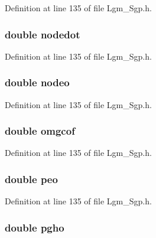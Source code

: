 Definition at line 135 of file Lgm\_\-Sgp.h.\hypertarget{struct___sgp_info_9a7d9ae35fbeac8903eb8ebf5f9d31cc}{
\subsubsection[{nodedot}]{\setlength{\rightskip}{0pt plus 5cm}double {\bf nodedot}}}
\label{struct___sgp_info_9a7d9ae35fbeac8903eb8ebf5f9d31cc}




Definition at line 135 of file Lgm\_\-Sgp.h.\hypertarget{struct___sgp_info_8496b25cf07aff8b5d0944cc2e229778}{
\subsubsection[{nodeo}]{\setlength{\rightskip}{0pt plus 5cm}double {\bf nodeo}}}
\label{struct___sgp_info_8496b25cf07aff8b5d0944cc2e229778}




Definition at line 135 of file Lgm\_\-Sgp.h.\hypertarget{struct___sgp_info_9b0060ff74bc3469f158f9d4cfa578ea}{
\subsubsection[{omgcof}]{\setlength{\rightskip}{0pt plus 5cm}double {\bf omgcof}}}
\label{struct___sgp_info_9b0060ff74bc3469f158f9d4cfa578ea}




Definition at line 135 of file Lgm\_\-Sgp.h.\hypertarget{struct___sgp_info_689de6e0b3caffccb68dcee94abb1018}{
\subsubsection[{peo}]{\setlength{\rightskip}{0pt plus 5cm}double {\bf peo}}}
\label{struct___sgp_info_689de6e0b3caffccb68dcee94abb1018}




Definition at line 135 of file Lgm\_\-Sgp.h.\hypertarget{struct___sgp_info_f56cf39324cbf2fe295bf84dc69e3e8f}{
\subsubsection[{pgho}]{\setlength{\rightskip}{0pt plus 5cm}double {\bf pgho}}}
\label{struct___sgp_info_f56cf39324cbf2fe295bf84dc69e3e8f}




